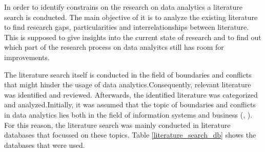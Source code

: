 
In order to identify constrains on the research on data analytics a literature search is conducted. The main objective of it is to analyze the existing literature to find research gaps, particularities and interrelationships between literature. This is supposed to give insights into the current state of research and to find out which part of the research process on data analyitcs still has room for improvements.


The literature search itself is conducted in the field of boundaries and conflicts that might hinder the usage of data analytics.Consequently, relevant literature was identified and reviewed. Afterwards, the identified literature was categorized and analyzed.Initially, it was assumed that the topic of boundaries and conflicts in data analytics lies both in the field of information systems and business (\cite{Abbasi.2016}, \cite{Levina.2005}). For this reason, the literature search was mainly conducted in literature databases that focussed on these topics. Table \ref{literature_search_db} shows the databases that were used. 








